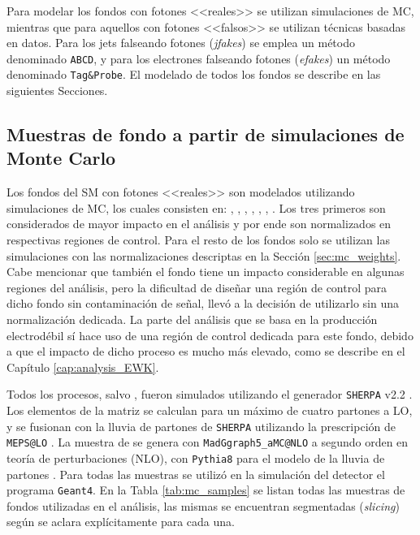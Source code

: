 Para modelar los fondos con fotones <<reales>> se utilizan simulaciones de MC, mientras que para aquellos con fotones <<falsos>> se utilizan técnicas basadas en datos. 
Para los jets falseando fotones (\textit{jfakes}) se emplea un método denominado \texttt{ABCD}, y para los electrones falseando fotones (\textit{efakes}) un método denominado \texttt{Tag\&Probe}. El modelado de todos los fondos se describe en las siguientes Secciones.

\subsection{Muestras de fondo a partir de simulaciones de Monte Carlo}

Los fondos del SM con fotones <<reales>> son modelados utilizando simulaciones de MC, los cuales consisten en: \phj, \wph, \ttbarph, \wphph, \zph, \zphph, \phph. Los tres primeros son considerados de mayor impacto en el análisis y por ende son normalizados en respectivas regiones de control. Para el resto de los fondos solo se utilizan las simulaciones con las normalizaciones descriptas en la Sección \ref{sec:mc_weights}. 
Cabe mencionar que también el fondo \znunuph tiene un impacto considerable en algunas regiones del análisis, pero la dificultad de diseñar una región de control para dicho fondo sin contaminación de señal, llevó a la decisión de utilizarlo sin una normalización dedicada. 
La parte del análisis que se basa en la producción electrodébil sí hace uso de una región de control dedicada para este fondo, debido a que el impacto de dicho proceso es mucho más elevado, como se describe en el Capítulo \ref{cap:analysis_EWK}.

Todos los procesos, salvo \ttbarph, fueron simulados utilizando el generador {\texttt{SHERPA} v2.2} \cite{Bothmann:2019yzt}. Los elementos de la matriz se calculan para un máximo de cuatro partones
a LO, y se fusionan con la lluvia de partones de \texttt{SHERPA} \cite{Schumann:2007mg} utilizando la prescripción de \texttt{MEPS@LO} \cite{Hoeche:2012yf}. La muestra de \ttbarph se genera con \texttt{MadGgraph5\_aMC@NLO} \cite{Alwall:2014hca} a segundo orden en teoría de perturbaciones (NLO), con \texttt{Pythia8} para el modelo de la lluvia de partones \cite{Sjostrand:2014zea}. 
Para todas las muestras se utilizó en la simulación del detector el programa \texttt{Geant4}. En la Tabla \ref{tab:mc_samples} se listan todas las muestras de fondos utilizadas en el análisis, las mismas se encuentran segmentadas (\textit{slicing}) según se aclara explícitamente para cada una.

